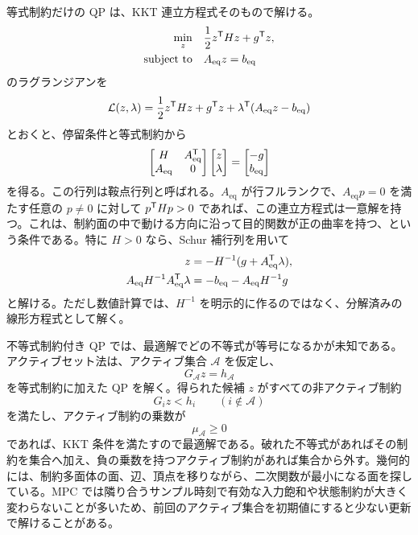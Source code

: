 等式制約だけの QP は、KKT 連立方程式そのもので解ける。
\begin{align}
  \min_z\quad &
  \frac{1}{2}z^{\mathsf{T}} Hz+g^{\mathsf{T}} z,\\
  \text{subject to}\quad &
  A_{\mathrm{eq}}z=b_{\mathrm{eq}}
\end{align}
のラグランジアンを
\begin{equation}
  \mathcal{L}(z,\lambda)
  =\frac{1}{2}z^{\mathsf{T}} Hz+g^{\mathsf{T}} z
  +\lambda^{\mathsf{T}}(A_{\mathrm{eq}}z-b_{\mathrm{eq}})
\end{equation}
とおくと、停留条件と等式制約から
\begin{equation}
  \begin{bmatrix}
    H&A_{\mathrm{eq}}^{\mathsf{T}}\\
    A_{\mathrm{eq}}&0
  \end{bmatrix}
  \begin{bmatrix}
    z\\\lambda
  \end{bmatrix}
  =
  \begin{bmatrix}
    -g\\b_{\mathrm{eq}}
  \end{bmatrix}
\end{equation}
を得る。この行列は鞍点行列と呼ばれる。$A_{\mathrm{eq}}$ が行フルランクで、$A_{\mathrm{eq}}p=0$ を満たす任意の $p\ne0$ に対して $p^{\mathsf{T}} Hp>0$ であれば、この連立方程式は一意解を持つ。これは、制約面の中で動ける方向に沿って目的関数が正の曲率を持つ、という条件である。特に $H>0$ なら、Schur 補行列を用いて
\begin{align}
  z&=-H^{-1}(g+A_{\mathrm{eq}}^{\mathsf{T}}\lambda),\\
  A_{\mathrm{eq}}H^{-1}A_{\mathrm{eq}}^{\mathsf{T}}\lambda
  &=-b_{\mathrm{eq}}-A_{\mathrm{eq}}H^{-1}g
\end{align}
と解ける。ただし数値計算では、$H^{-1}$ を明示的に作るのではなく、分解済みの線形方程式として解く。

不等式制約付き QP では、最適解でどの不等式が等号になるかが未知である。アクティブセット法は、アクティブ集合 $\mathcal{A}$ を仮定し、
\begin{equation}
  G_{\mathcal{A}}z=h_{\mathcal{A}}
\end{equation}
を等式制約に加えた QP を解く。得られた候補 $z$ がすべての非アクティブ制約
\begin{equation}
  G_i z<h_i
  \qquad (i\notin\mathcal{A})
\end{equation}
を満たし、アクティブ制約の乗数が
\begin{equation}
  \mu_{\mathcal{A}}\ge0
\end{equation}
であれば、KKT 条件を満たすので最適解である。破れた不等式があればその制約を集合へ加え、負の乗数を持つアクティブ制約があれば集合から外す。幾何的には、制約多面体の面、辺、頂点を移りながら、二次関数が最小になる面を探している。MPC では隣り合うサンプル時刻で有効な入力飽和や状態制約が大きく変わらないことが多いため、前回のアクティブ集合を初期値にすると少ない更新で解けることがある。

